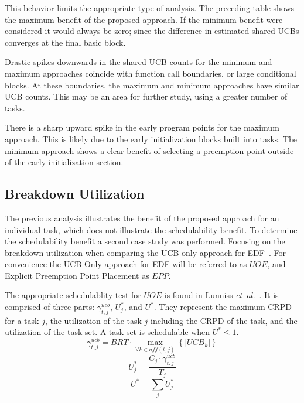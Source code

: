 This behavior limits the appropriate type of analysis. The preceding
table shows the maximum benefit of the proposed approach. If the
minimum benefit were considered it would always be zero; since the
difference in estimated shared UCBs converges at the final basic
block.

Drastic spikes downwards in the shared UCB counts for the minimum and
maximum approaches coincide with function call boundaries, or large
conditional blocks. At these boundaries, the maximum and minimum
approaches have similar UCB counts. This may be an area for further
study, using a greater number of tasks.

There is a sharp upward spike in the early program points for the
maximum approach. This is likely due to the early initialization
blocks built into tasks. The minimum approach shows a clear benefit of
selecting a preemption point outside of the early initialization
section.

\subsection{Breakdown Utilization}

The previous analysis illustrates the benefit of the proposed
approach for an individual task, which does not illustrate the
schedulability benefit. To determine the schedulability benefit a
second case study was performed. Focusing on the breakdown utilization
when comparing the UCB only approach for EDF~\cite{lunniss:13}. For
convenience the UCB Only approach for EDF will be referred to as
${UOE}$, and Explicit Preemption Point Placement as ${EPP}$.

The appropriate schedulablity test for ${UOE}$ is found in
Lunniss \emph{et~al.}~\cite{lunniss:13}. It is comprised of three
parts: ${\gamma^{ucb}_{t,j}}$, ${U^*_j}$, and ${U^*}$. They represent
the maximum CRPD for a task ${j}$, the utilization of the task ${j}$
including the CRPD of the task, and the utilization of the task set.
A task set is schedulable when ${U^* \le 1}$.
\begin{equation}
  \gamma^{ucb}_{t,j} = BRT \cdot \max\limits_{\forall k \in aff(t,j)}
  \left\{ \left| UCB_k \right| \right\}
\end{equation}
\begin{equation}
  U^*_j = \frac{C_j \cdot \gamma^{ucb}_{t,j}}{T_j}
\end{equation}
\begin{equation}
  U^* = \sum_j U^*_j
\end{equation}

